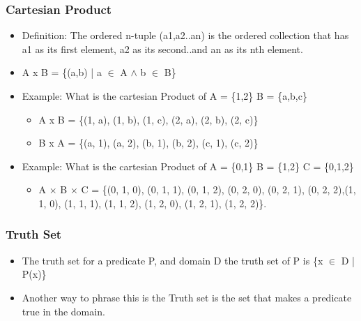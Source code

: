 \documentclass[11pt]{article}
\begin{document}
\subsubsection{Cartesian Product}
\label{sec-2-1-9}
\begin{itemize}

\item Definition: The ordered n-tuple (a1,a2..an) is the ordered collection that has a1 as its first element, a2 as its second..and an as its nth element.
\label{sec-2-1-9-1}%

\item A x B = \{(a,b) | a $\in$ A $\wedge$ b $\in$ B\}
\label{sec-2-1-9-2}%

\item Example: What is the cartesian Product of A = \{1,2\} B = \{a,b,c\}
\label{sec-2-1-9-3}%
\begin{itemize}

\item A x B = \{(1, a), (1, b), (1, c), (2, a), (2, b), (2, c)\}
\label{sec-2-1-9-3-1}%

\item B x A = \{(a, 1), (a, 2), (b, 1), (b, 2), (c, 1), (c, 2)\}
\label{sec-2-1-9-3-2}%
\end{itemize} %

\item Example: What is the cartesian Product of A = \{0,1\} B = \{1,2\} C = \{0,1,2\}
\label{sec-2-1-9-4}%
\begin{itemize}

\item A × B × C = \{(0, 1, 0), (0, 1, 1), (0, 1, 2), (0, 2, 0), (0, 2, 1), (0, 2, 2),(1, 1, 0), (1, 1, 1), (1, 1, 2), (1, 2, 0), (1, 2, 1), (1, 2, 2)\}.
\label{sec-2-1-9-4-1}%
\end{itemize} %
\end{itemize} %
\subsubsection{Truth Set}
\label{sec-2-1-10}
\begin{itemize}

\item The truth set for a predicate P, and domain D the truth set of P is \{x $\in$ D | P(x)\}
\label{sec-2-1-10-1}%

\item Another way to phrase this is the Truth set is the set that makes a predicate true in the domain.
\label{sec-2-1-10-2}%
\end{itemize} %
\end{document}
